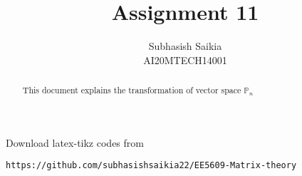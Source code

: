 \documentclass[journal,12pt]{IEEEtran}
\begin{document}
\onecolumn

\newtheorem{theorem}{Theorem}[section]
\newtheorem{problem}{Problem}
\newtheorem{proposition}{Proposition}[section]
\newtheorem{lemma}{Lemma}[section]
\newtheorem{corollary}[theorem]{Corollary}
\newtheorem{example}{Example}[section]
\newtheorem{definition}[problem]{Definition}

\newcommand{\BEQA}{\begin{eqnarray}}
\newcommand{\EEQA}{\end{eqnarray}}
\newcommand{\define}{\stackrel{\triangle}{=}}

\raggedbottom
\setlength{\parindent}{0pt}
\providecommand{\mbf}{\mathbf}
\providecommand{\pr}[1]{\ensuremath{\Pr\left(#1\right)}}
\providecommand{\qfunc}[1]{\ensuremath{Q\left(#1\right)}}
\providecommand{\sbrak}[1]{\ensuremath{{}\left[#1\right]}}
\providecommand{\lsbrak}[1]{\ensuremath{{}\left[#1\right.}}
\providecommand{\rsbrak}[1]{\ensuremath{{}\left.#1\right]}}
\providecommand{\brak}[1]{\ensuremath{\left(#1\right)}}
\providecommand{\lbrak}[1]{\ensuremath{\left(#1\right.}}
\providecommand{\rbrak}[1]{\ensuremath{\left.#1\right)}}
\providecommand{\cbrak}[1]{\ensuremath{\left\{#1\right\}}}
\providecommand{\lcbrak}[1]{\ensuremath{\left\{#1\right.}}
\providecommand{\rcbrak}[1]{\ensuremath{\left.#1\right\}}}
\theoremstyle{remark}
\newtheorem{rem}{Remark}
\newcommand{\sgn}{\mathop{\mathrm{sgn}}}
\providecommand{\system}{\overset{\mathcal{H}}{ \longleftrightarrow}}
\newcommand{\solution}{\noindent \textbf{Solution: }}
\newcommand{\cosec}{\,\text{cosec}\,}
\providecommand{\dec}[2]{\ensuremath{\overset{#1}{\underset{#2}{\gtrless}}}}
\newcommand{\myvec}[1]{\ensuremath{\begin{pmatrix}#1\end{pmatrix}}}
\newcommand{\mydet}[1]{\ensuremath{\begin{vmatrix}#1\end{vmatrix}}}
\makeatletter
{}
\makeatother
\let\StandardTheFigure\thefigure
\let\vec\mathbf
\renewcommand{\thefigure}{\theproblem}
\def\putbox#1#2#3{\makebox[0in][l]{\makebox[#1][l]{}\raisebox{\baselineskip}[0in][0in]{\raisebox{#2}[0in][0in]{#3}}}}
     \def\rightbox#1{\makebox[0in][r]{#1}}
     \def\centbox#1{\makebox[0in]{#1}}
     \def\topbox#1{\raisebox{-\baselineskip}[0in][0in]{#1}}
     \def\midbox#1{\raisebox{-0.5\baselineskip}[0in][0in]{#1}}
\vspace{3cm}
\title{Assignment 11}
\author{Subhasish Saikia\\AI20MTECH14001}
\maketitle
\begin{abstract}
This document explains the transformation of vector space $\mathbb{P}_{n}$
\end{abstract}
\bigskip
\renewcommand{\thefigure}{\theenumi}
\renewcommand{\thetable}{\theenumi}
Download latex-tikz codes from
\begin{lstlisting}
https://github.com/subhasishsaikia22/EE5609-Matrix-theory
\end{lstlisting}
\end{document}
